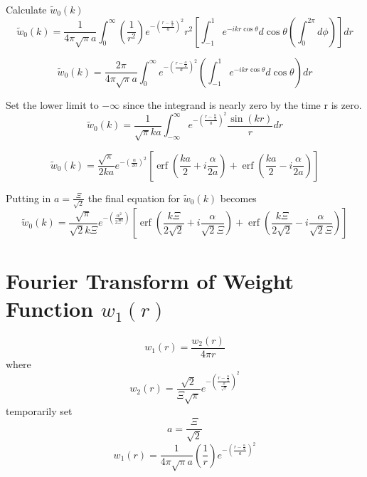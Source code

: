 \documentclass[double,12pt]{beavtex}
\begin{document}
Calculate $\widetilde{w}_0(k)$ 
\begin{equation}{\widetilde{w}_0(k)=\frac{1}{4{\pi}\sqrt{\pi}a}\int_{0}^{\infty}\left(\frac{1}{r^2}\right)e^{-\left(\frac{r-\frac{\alpha}{2}}{a}\right)^2}r^2\left[\int_{-1}^{1}e^{-ikr\cos\theta}d{\cos\theta}\left(\int_{0}^{2\pi}d{\phi}\right)\right]d{r}}\end{equation}

\begin{equation}{\widetilde{w}_0(k)=\frac{2\pi}{4{\pi}\sqrt{\pi}a}\int_{0}^{\infty}e^{-\left(\frac{r-\frac{\alpha}{2}}{a}\right)^2}\left(\int_{-1}^{1}e^{-ikr\cos\theta}d{\cos\theta}\right)d{r}}\end{equation}

Set the lower limit to $-\infty$  since the integrand is nearly zero by the time r is zero. 
\begin{equation}{\widetilde{w}_0(k)=\frac{1}{\sqrt{\pi}ka}\int_{-\infty}^{\infty}e^{-\left(\frac{r-\frac{\alpha}{2}}{a}\right)^2}\frac{\sin(kr)}{r}d{r}}\end{equation}

\begin{equation}{\widetilde{w}_0(k)=\frac{\sqrt{\pi}}{2ka}e^{-\left(\frac{\alpha}{2a}\right)^2}\left[\operatorname{erf}\left(\frac{ka}{2}+i\frac{\alpha}{2a}\right)+\operatorname{erf}\left(\frac{ka}{2}-i\frac{\alpha}{2a}\right)\right]}\end{equation}
 
Putting in $a=\frac{\Xi}{\sqrt{2}}$ the final equation for $\widetilde{w}_0(k)$ becomes
\begin{equation}{\widetilde{w}_0(k)=\frac{\sqrt{\pi}}{\sqrt{2}k\Xi}e^{-\left(\frac{\alpha^2}{2\Xi^2}\right)}\left[\operatorname{erf}\left(\frac{k\Xi}{2\sqrt{2}}+i\frac{\alpha}{\sqrt{2}\Xi}\right)+\operatorname{erf}\left(\frac{k\Xi}{2\sqrt{2}}-i\frac{\alpha}{\sqrt{2}\Xi}\right)\right]}\end{equation}

\section{Fourier Transform of Weight Function $w_{1}(r)$}
\begin{equation}{w_1(r)=\frac{w_2(r)}{4{\pi}r}}\end{equation}
where
\begin{equation}{w_2(r)=\frac{\sqrt{2}}{\Xi\sqrt{\pi}}e^{-\left(\frac{r-\frac{\alpha}{2}}{\frac{\Xi}{\sqrt{2}}}\right)^2}}\end{equation}
temporarily set 
\begin{equation}{a=\frac{\Xi}{\sqrt{2}}}\end{equation}
\begin{equation}{w_1(r)=\frac{1}{4{\pi}\sqrt{\pi}a}\left(\frac{1}{r}\right)e^{-\left(\frac{r-\frac{\alpha}{2}}{a}\right)^2}}\end{equation}
\end{document}
